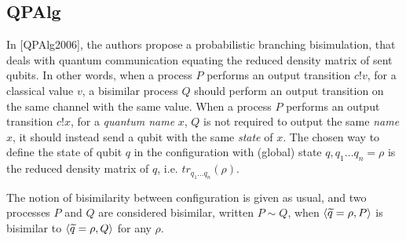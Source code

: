 \subsection{QPAlg}

In [QPAlg2006], the authors propose a probabilistic branching bisimulation, that deals with quantum communication equating the reduced density matrix of sent qubits. In other words, when a process $P$ performs an output transition $c!v$, for a classical value $v$, a bisimilar process $Q$ should perform an output transition on the same channel with the same value. When a process $P$ performs an output transition $c!x$, for a \textit{quantum name} $x$, $Q$ is not required to output the same \textit{name} $x$, it should instead send a qubit with the same \textit{state} of $x$. The chosen way to define the state of qubit $q$ in the configuration with (global) state $q, q_1 \ldots q_n = \rho$ is the reduced density matrix of $q$, i.e. $tr_{q_1 \ldots q_n}(\rho)$.


The notion of bisimilarity between configuration is given as usual, and two processes $P$ and $Q$ are considered bisimilar, written $P \sim Q$, when $\langle\widetilde{q} = \rho, P\rangle$ is bisimilar to $\langle\widetilde{q} = \rho, Q\rangle$ for any $\rho$.

